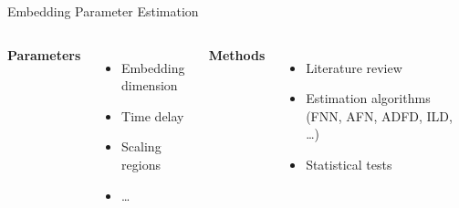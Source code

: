 \documentclass{beamer}
\begin{document}
\begin{frame}[t]{Embedding Parameter Estimation}
  \begin{columns}
    \textbf{Parameters}
      \begin{itemize}
        \item Embedding dimension
        \item Time delay
        \item Scaling regions
        \item \ldots
      \end{itemize}

    \textbf{Methods}
      \begin{itemize}
        \item Literature review
        \item Estimation algorithms (FNN, AFN, ADFD, ILD, \ldots)
        \item Statistical tests
      \end{itemize}
  \end{columns}
  \vfill
\end{frame}

\end{document}

